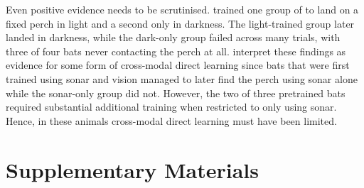 \documentclass[11pt]{article}
\begin{document}
Even positive evidence needs to be scrutinised. \citet{Finger2025} trained one group of  to land on a fixed perch in light and a second only in darkness. The light-trained group later landed in darkness, while the dark-only group failed across many trials, with three of four bats never contacting the perch at all. \citet{Finger2025} interpret these findings as evidence for some form of cross-modal direct learning since bats that were first trained using sonar and vision managed to later find the perch using sonar alone while the sonar-only group did not. However, the two of three pretrained bats required substantial additional training when restricted to only using sonar. Hence, in these animals cross-modal direct learning must have been limited.





\clearpage
\section*{Supplementary Materials}
\setcounter{table}{0}
\setcounter{figure}{0}
\renewcommand{\thetable}{S\arabic{table}}
\renewcommand{\thefigure}{S\arabic{figure}}
\end{document}
